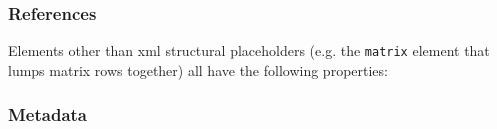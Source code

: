 \documentclass{article}
\newcommand{\code}{\texttt}
\begin{document}
\subsubsection{References}
Elements other than xml structural placeholders (e.g. the \code{matrix} element
that lumps matrix rows together) all have the following properties:

\subsubsection{Metadata}
\end{document}

